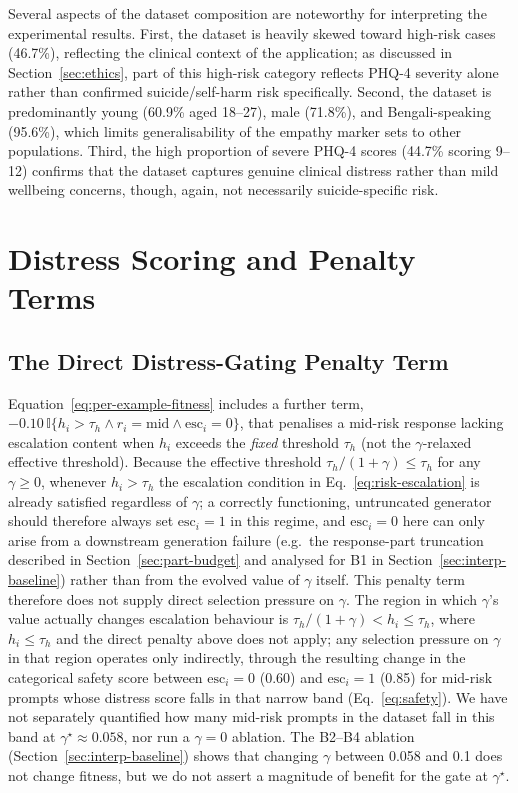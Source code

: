 \documentclass[mathematics,article,submit,xetex,moreauthors]{Definitions/mdpi}
\begin{document}
Several aspects of the dataset composition are noteworthy for interpreting
the experimental results. First, the dataset is heavily skewed toward
high-risk cases (46.7\%), reflecting the clinical context of the
application; as discussed in Section~\ref{sec:ethics}, part of this
high-risk category reflects PHQ-4 severity alone rather than confirmed
suicide/self-harm risk specifically. Second, the dataset is predominantly young (60.9\% aged 18--27),
male (71.8\%), and Bengali-speaking (95.6\%), which limits generalisability
of the empathy marker sets to other populations. Third, the high proportion
of severe PHQ-4 scores (44.7\% scoring 9--12) confirms that the dataset
captures genuine clinical distress rather than mild wellbeing concerns,
though, again, not necessarily suicide-specific risk.

\section{Distress Scoring and Penalty Terms}
\label{app:distress}

\subsection{The Direct Distress-Gating Penalty Term}
\label{app:distress-penalty}

Equation~\eqref{eq:per-example-fitness}
includes a further term, $-0.10\,\mathbb{I}\{h_i > \tau_h \wedge r_i=\mathrm{mid}
\wedge \mathrm{esc}_i=0\}$, that penalises a mid-risk response lacking
escalation content when $h_i$ exceeds the \emph{fixed} threshold $\tau_h$
(not the $\gamma$-relaxed effective threshold). Because the effective
threshold $\tau_h/(1+\gamma) \le \tau_h$ for any $\gamma \ge 0$, whenever
$h_i > \tau_h$ the escalation condition in Eq.~\eqref{eq:risk-escalation} is
already satisfied regardless of $\gamma$; a correctly functioning,
untruncated generator should therefore always set $\mathrm{esc}_i=1$ in
this regime, and $\mathrm{esc}_i=0$ here can only arise from a downstream
generation failure (e.g.\ the response-part truncation described in
Section~\ref{sec:part-budget} and analysed for B1 in
Section~\ref{sec:interp-baseline}) rather than from the evolved value of
$\gamma$ itself. This penalty term therefore does not supply direct
selection pressure on $\gamma$. The region in which $\gamma$'s value
actually changes escalation behaviour is $\tau_h/(1+\gamma) < h_i \le
\tau_h$, where $h_i \le \tau_h$ and the direct penalty above does not
apply; any selection pressure on $\gamma$ in that region operates only
indirectly, through the resulting change in the categorical safety score
between $\mathrm{esc}_i=0$ (0.60) and $\mathrm{esc}_i=1$ (0.85) for
mid-risk prompts whose distress score falls in that narrow band
(Eq.~\eqref{eq:safety}). We have not separately quantified how many
mid-risk prompts in the dataset fall in this band at $\gamma^{\star}
\approx 0.058$, nor run a $\gamma=0$ ablation. The B2--B4 ablation (Section~\ref{sec:interp-baseline}) shows that changing $\gamma$ between 0.058 and 0.1 does not change fitness, but we do not assert a magnitude of benefit for the gate at $\gamma^{\star}$.
\end{document}
